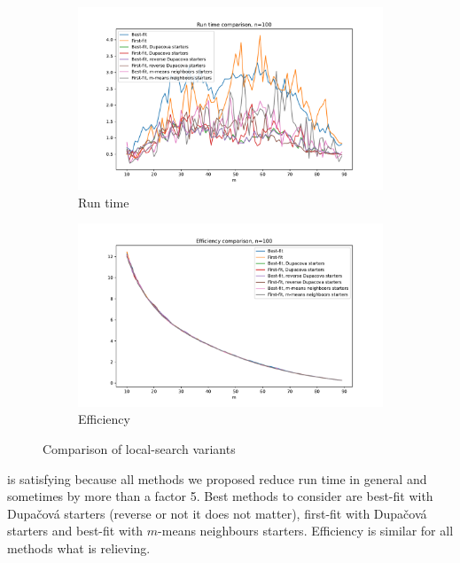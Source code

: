\documentclass{amsart}
\begin{document}
\begin{figure}[ht]
    \centering
    \begin{subfigure}[b]{0.495\textwidth}
        \centering
        \includegraphics[width=1.1\textwidth]{plots/run time methods.pdf}
        \caption{Run time}
    \end{subfigure}
    \hfill
    \begin{subfigure}[b]{0.495\textwidth}
        \centering
        \includegraphics[width=1.1\textwidth]{plots/value methods.pdf}
        \caption{Efficiency}
    \end{subfigure}
    \caption{Comparison of local-search variants}
    \label{methods}
\end{figure}

 is satisfying because all methods we proposed reduce run time in general and sometimes by more than a factor 5. Best methods to consider are best-fit with Dupačová starters (reverse or not it does not matter), first-fit with Dupačová starters and best-fit with $m$-means neighbours starters. Efficiency is similar for all methods what is relieving. 
\end{document}
